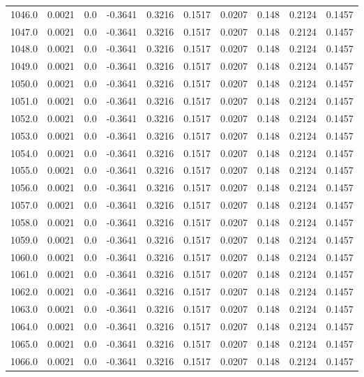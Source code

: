 \begin{longtable}{lrrrrrrrrr}
1046.0 & 0.0021 & 0.0 & -0.3641 & 0.3216 & 0.1517 & 0.0207 & 0.148 & 0.2124 & 0.1457 \\
1047.0 & 0.0021 & 0.0 & -0.3641 & 0.3216 & 0.1517 & 0.0207 & 0.148 & 0.2124 & 0.1457 \\
1048.0 & 0.0021 & 0.0 & -0.3641 & 0.3216 & 0.1517 & 0.0207 & 0.148 & 0.2124 & 0.1457 \\
1049.0 & 0.0021 & 0.0 & -0.3641 & 0.3216 & 0.1517 & 0.0207 & 0.148 & 0.2124 & 0.1457 \\
1050.0 & 0.0021 & 0.0 & -0.3641 & 0.3216 & 0.1517 & 0.0207 & 0.148 & 0.2124 & 0.1457 \\
1051.0 & 0.0021 & 0.0 & -0.3641 & 0.3216 & 0.1517 & 0.0207 & 0.148 & 0.2124 & 0.1457 \\
1052.0 & 0.0021 & 0.0 & -0.3641 & 0.3216 & 0.1517 & 0.0207 & 0.148 & 0.2124 & 0.1457 \\
1053.0 & 0.0021 & 0.0 & -0.3641 & 0.3216 & 0.1517 & 0.0207 & 0.148 & 0.2124 & 0.1457 \\
1054.0 & 0.0021 & 0.0 & -0.3641 & 0.3216 & 0.1517 & 0.0207 & 0.148 & 0.2124 & 0.1457 \\
1055.0 & 0.0021 & 0.0 & -0.3641 & 0.3216 & 0.1517 & 0.0207 & 0.148 & 0.2124 & 0.1457 \\
1056.0 & 0.0021 & 0.0 & -0.3641 & 0.3216 & 0.1517 & 0.0207 & 0.148 & 0.2124 & 0.1457 \\
1057.0 & 0.0021 & 0.0 & -0.3641 & 0.3216 & 0.1517 & 0.0207 & 0.148 & 0.2124 & 0.1457 \\
1058.0 & 0.0021 & 0.0 & -0.3641 & 0.3216 & 0.1517 & 0.0207 & 0.148 & 0.2124 & 0.1457 \\
1059.0 & 0.0021 & 0.0 & -0.3641 & 0.3216 & 0.1517 & 0.0207 & 0.148 & 0.2124 & 0.1457 \\
1060.0 & 0.0021 & 0.0 & -0.3641 & 0.3216 & 0.1517 & 0.0207 & 0.148 & 0.2124 & 0.1457 \\
1061.0 & 0.0021 & 0.0 & -0.3641 & 0.3216 & 0.1517 & 0.0207 & 0.148 & 0.2124 & 0.1457 \\
1062.0 & 0.0021 & 0.0 & -0.3641 & 0.3216 & 0.1517 & 0.0207 & 0.148 & 0.2124 & 0.1457 \\
1063.0 & 0.0021 & 0.0 & -0.3641 & 0.3216 & 0.1517 & 0.0207 & 0.148 & 0.2124 & 0.1457 \\
1064.0 & 0.0021 & 0.0 & -0.3641 & 0.3216 & 0.1517 & 0.0207 & 0.148 & 0.2124 & 0.1457 \\
1065.0 & 0.0021 & 0.0 & -0.3641 & 0.3216 & 0.1517 & 0.0207 & 0.148 & 0.2124 & 0.1457 \\
1066.0 & 0.0021 & 0.0 & -0.3641 & 0.3216 & 0.1517 & 0.0207 & 0.148 & 0.2124 & 0.1457 \\

\end{longtable}
